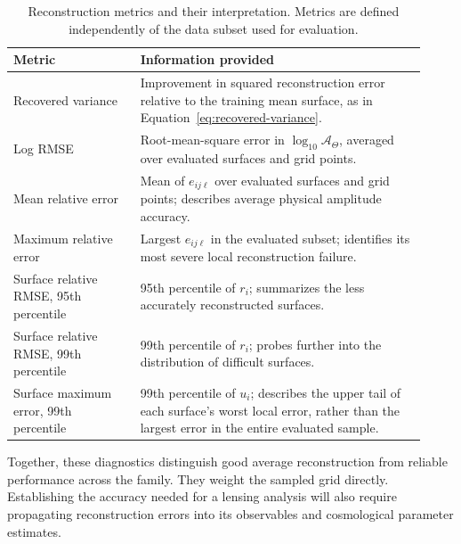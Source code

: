 \begin{table}[!htbp]
\centering
\caption{Reconstruction metrics and their interpretation. Metrics are
defined independently of the data subset used for evaluation.}
\label{tab:validation-metrics}
\small
\begin{tabular}{@{}p{0.29\linewidth}p{0.63\linewidth}@{}}
\toprule
Metric & Information provided \\
\midrule
Recovered variance & Improvement in squared reconstruction error
relative to the training mean surface, as in
Equation~\eqref{eq:recovered-variance}. \\
Log RMSE & Root-mean-square error in $\log_{10}\mathcal A_\Theta$,
averaged over evaluated surfaces and grid points. \\
Mean relative error & Mean of $e_{ij\ell}$ over evaluated surfaces and
grid points; describes average physical amplitude accuracy. \\
Maximum relative error & Largest $e_{ij\ell}$ in the evaluated subset;
identifies its most severe local reconstruction failure. \\
Surface relative RMSE, 95th percentile & 95th percentile of $r_i$;
summarizes the less accurately reconstructed surfaces. \\
Surface relative RMSE, 99th percentile & 99th percentile of $r_i$;
probes further into the distribution of difficult surfaces. \\
Surface maximum error, 99th percentile & 99th percentile of $u_i$;
describes the upper tail of each surface's worst local error, rather
than the largest error in the entire evaluated sample. \\
\bottomrule
\end{tabular}
\end{table}

Together, these diagnostics distinguish good average reconstruction from
reliable performance across the family. They weight the sampled grid
directly. Establishing the accuracy needed for a lensing analysis will
also require propagating reconstruction errors into its observables and
cosmological parameter estimates.
